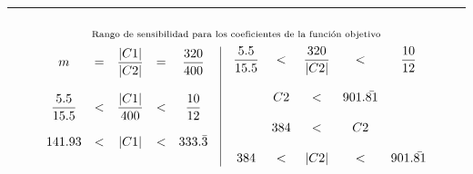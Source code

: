 \documentclass[12pt]{article}
\begin{document}
\vspace{1cm}
\noindent\rule{\textwidth}{0.4pt}
\vspace{0.5cm}

\[\overset{\text{Rango de sensibilidad para los coeficientes de la función objetivo}\vphantom{\Big|}}{
  \begin{array}{c|c}
    \begin{array}{c c c c c}
      m & = & \dfrac{\left|C1\right|}{\left|C2\right|} & = & \dfrac{320}{400} \\\\
      \dfrac{5.5}{15.5} & < & \dfrac{\left|C1\right|}{400} & < & \dfrac{10}{12} \\\\
      141.93 & < & \left|C1\right| & < & 333.\bar{3} \\\\
    \end{array}
    &
    \begin{array}{c c c c c}
      \dfrac{5.5}{15.5} & < & \dfrac{320}{\left|C2\right|} & < & \dfrac{10}{12} \\\\
      & C2 & < & 901.\bar{81} & \\\\
      & 384 & < & C2 & \\\\
      384 & < & \left|C2\right| & < & 901.\bar{81} 
    \end{array}
  \end{array}
}\]
\end{document}
